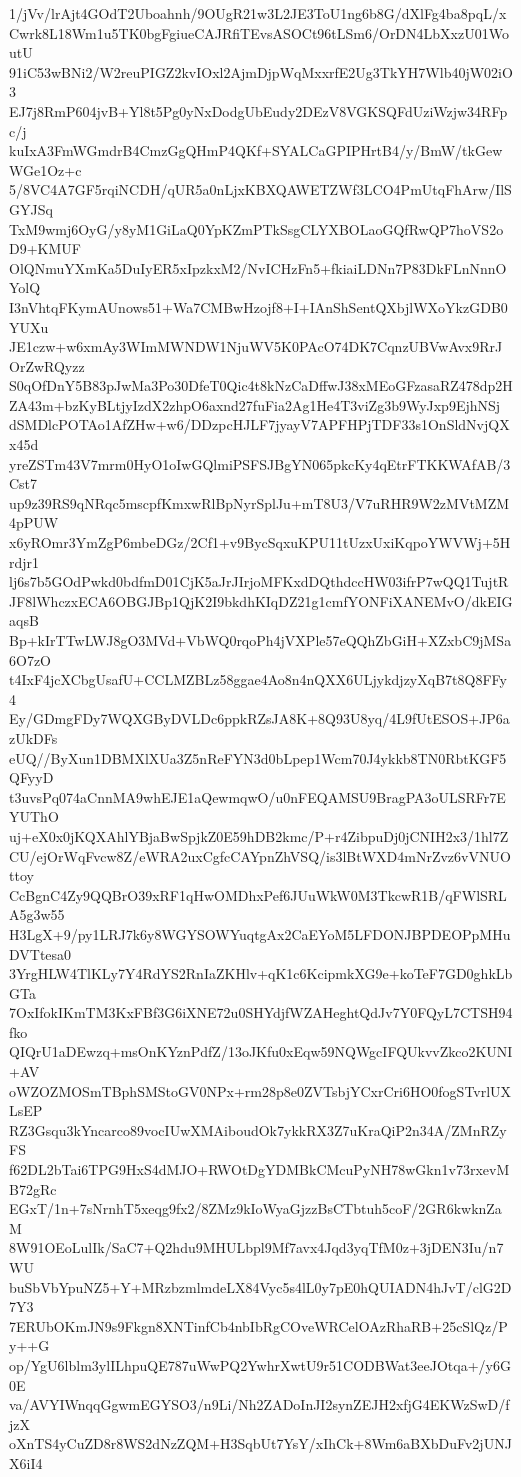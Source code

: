 1/jVv/lrAjt4GOdT2Uboahnh/9OUgR21w3L2JE3ToU1ng6b8G/dXlFg4ba8pqL/x
Cwrk8L18Wm1u5TK0bgFgiueCAJRfiTEvsASOCt96tLSm6/OrDN4LbXxzU01WoutU
91iC53wBNi2/W2reuPIGZ2kvIOxl2AjmDjpWqMxxrfE2Ug3TkYH7Wlb40jW02iO3
EJ7j8RmP604jvB+Yl8t5Pg0yNxDodgUbEudy2DEzV8VGKSQFdUziWzjw34RFpc/j
kuIxA3FmWGmdrB4CmzGgQHmP4QKf+SYALCaGPIPHrtB4/y/BmW/tkGewWGe1Oz+c
5/8VC4A7GF5rqiNCDH/qUR5a0nLjxKBXQAWETZWf3LCO4PmUtqFhArw/IlSGYJSq
TxM9wmj6OyG/y8yM1GiLaQ0YpKZmPTkSsgCLYXBOLaoGQfRwQP7hoVS2oD9+KMUF
OlQNmuYXmKa5DuIyER5xIpzkxM2/NvICHzFn5+fkiaiLDNn7P83DkFLnNnnOYolQ
I3nVhtqFKymAUnows51+Wa7CMBwHzojf8+I+IAnShSentQXbjlWXoYkzGDB0YUXu
JE1czw+w6xmAy3WImMWNDW1NjuWV5K0PAcO74DK7CqnzUBVwAvx9RrJOrZwRQyzz
S0qOfDnY5B83pJwMa3Po30DfeT0Qic4t8kNzCaDffwJ38xMEoGFzasaRZ478dp2H
ZA43m+bzKyBLtjyIzdX2zhpO6axnd27fuFia2Ag1He4T3viZg3b9WyJxp9EjhNSj
dSMDlcPOTAo1AfZHw+w6/DDzpcHJLF7jyayV7APFHPjTDF33s1OnSldNvjQXx45d
yreZSTm43V7mrm0HyO1oIwGQlmiPSFSJBgYN065pkcKy4qEtrFTKKWAfAB/3Cst7
up9z39RS9qNRqc5mscpfKmxwRlBpNyrSplJu+mT8U3/V7uRHR9W2zMVtMZM4pPUW
x6yROmr3YmZgP6mbeDGz/2Cf1+v9BycSqxuKPU11tUzxUxiKqpoYWVWj+5Hrdjr1
lj6s7b5GOdPwkd0bdfmD01CjK5aJrJIrjoMFKxdDQthdccHW03ifrP7wQQ1TujtR
JF8lWhczxECA6OBGJBp1QjK2I9bkdhKIqDZ21g1cmfYONFiXANEMvO/dkEIGaqsB
Bp+kIrTTwLWJ8gO3MVd+VbWQ0rqoPh4jVXPle57eQQhZbGiH+XZxbC9jMSa6O7zO
t4IxF4jcXCbgUsafU+CCLMZBLz58ggae4Ao8n4nQXX6ULjykdjzyXqB7t8Q8FFy4
Ey/GDmgFDy7WQXGByDVLDc6ppkRZsJA8K+8Q93U8yq/4L9fUtESOS+JP6azUkDFs
eUQ//ByXun1DBMXlXUa3Z5nReFYN3d0bLpep1Wcm70J4ykkb8TN0RbtKGF5QFyyD
t3uvsPq074aCnnMA9whEJE1aQewmqwO/u0nFEQAMSU9BragPA3oULSRFr7EYUThO
uj+eX0x0jKQXAhlYBjaBwSpjkZ0E59hDB2kmc/P+r4ZibpuDj0jCNIH2x3/1hl7Z
CU/ejOrWqFvcw8Z/eWRA2uxCgfcCAYpnZhVSQ/is3lBtWXD4mNrZvz6vVNUOttoy
CcBgnC4Zy9QQBrO39xRF1qHwOMDhxPef6JUuWkW0M3TkcwR1B/qFWlSRLA5g3w55
H3LgX+9/py1LRJ7k6y8WGYSOWYuqtgAx2CaEYoM5LFDONJBPDEOPpMHuDVTtesa0
3YrgHLW4TlKLy7Y4RdYS2RnIaZKHlv+qK1c6KcipmkXG9e+koTeF7GD0ghkLbGTa
7OxIfokIKmTM3KxFBf3G6iXNE72u0SHYdjfWZAHeghtQdJv7Y0FQyL7CTSH94fko
QIQrU1aDEwzq+msOnKYznPdfZ/13oJKfu0xEqw59NQWgcIFQUkvvZkco2KUNI+AV
oWZOZMOSmTBphSMStoGV0NPx+rm28p8e0ZVTsbjYCxrCri6HO0fogSTvrlUXLsEP
RZ3Gsqu3kYncarco89vocIUwXMAiboudOk7ykkRX3Z7uKraQiP2n34A/ZMnRZyFS
f62DL2bTai6TPG9HxS4dMJO+RWOtDgYDMBkCMcuPyNH78wGkn1v73rxevMB72gRc
EGxT/1n+7sNrnhT5xeqg9fx2/8ZMz9kIoWyaGjzzBsCTbtuh5coF/2GR6kwknZaM
8W91OEoLulIk/SaC7+Q2hdu9MHULbpl9Mf7avx4Jqd3yqTfM0z+3jDEN3Iu/n7WU
buSbVbYpuNZ5+Y+MRzbzmlmdeLX84Vyc5s4lL0y7pE0hQUIADN4hJvT/clG2D7Y3
7ERUbOKmJN9s9Fkgn8XNTinfCb4nbIbRgCOveWRCelOAzRhaRB+25cSlQz/Py++G
op/YgU6lblm3ylILhpuQE787uWwPQ2YwhrXwtU9r51CODBWat3eeJOtqa+/y6G0E
va/AVYIWnqqGgwmEGYSO3/n9Li/Nh2ZADoInJI2synZEJH2xfjG4EKWzSwD/fjzX
oXnTS4yCuZD8r8WS2dNzZQM+H3SqbUt7YsY/xIhCk+8Wm6aBXbDuFv2jUNJX6iI4
